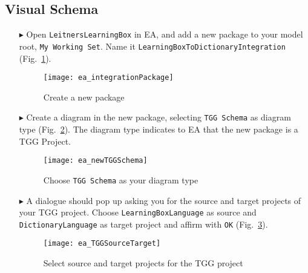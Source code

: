 \newpage
\hypertarget{schema vis}{}
\subsection{Visual Schema}
\visHeader

\begin{itemize}

\item[$\blacktriangleright$] Open \texttt{LeitnersLearningBox} in EA, and add a new package to your model root, \texttt{My Working Set}. Name it
\texttt{Learning\-Box\-To\-Dictionary\-Integration} (Fig.~\ref{fig:intgPackage}).

\vspace{0.5cm}

\begin{figure}[htbp]
\begin{center}
  \texttt{[image: ea\_integrationPackage]}
  \caption{Create a new package}  
  \label{fig:intgPackage}
\end{center}
\end{figure}

\item[$\blacktriangleright$] Create a diagram in the new package, selecting \texttt{TGG Schema} as diagram type (Fig.~\ref{fig:tgg_diagram_type}). The diagram
type indicates to EA that the new package is a TGG Project.

\vspace{0.5cm}

\begin{figure}[htbp]
\begin{center}
  \texttt{[image: ea\_newTGGSchema]}
  \caption{Choose \texttt{TGG Schema} as your diagram type}  
  \label{fig:tgg_diagram_type}
\end{center}
\end{figure}

\item[$\blacktriangleright$] A dialogue should pop up asking you for the source and target projects of your TGG project.  Choose
\texttt{Learning\-Box\-Language} as source and \texttt{Dictionary\-Language} as target project and affirm with \texttt{OK} (Fig.~\ref{fig:select_source_target}).

\vspace{0.5cm}

\begin{figure}[htbp]
\begin{center}
  \texttt{[image: ea\_TGGSourceTarget]}
  \caption{Select source and target projects for the TGG project}  
  \label{fig:select_source_target}
\end{center}
\end{figure}


\end{itemize}
